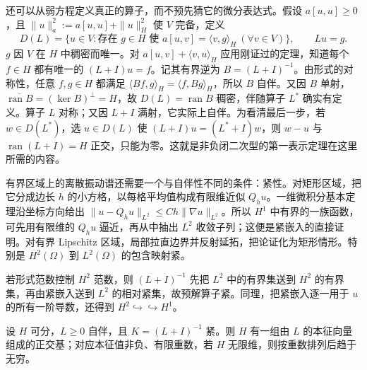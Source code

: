 还可以从弱方程定义真正的算子，而不预先猜它的微分表达式。假设 \(a[u,u]\ge0\)，且
\(\|u\|_a^2:=a[u,u]+\|u\|_H^2\) 使 \(V\) 完备，定义
\[
 D(L)=\{u\in V:\text{存在 }g\in H\text{ 使 }a[u,v]=\langle v,g\rangle_H\ (\forall v\in V)\},
 \qquad Lu=g.
\]
\(g\) 因 \(V\) 在 \(H\) 中稠密而唯一。对 \(a[u,v]+\langle v,u\rangle_H\) 应用刚证过的定理，知道每个 \(f\in H\) 都有唯一的
\((L+I)u=f\)。记其有界逆为 \(B=(L+I)^{-1}\)。由形式的对称性，任意 \(f,g\in H\) 都满足
\(\langle Bf,g\rangle_H=\langle f,Bg\rangle_H\)，所以 \(B\) 自伴。又因 \(B\) 单射，\(\overline{\operatorname{ran}B}=(\ker B)^{\perp}=H\)，故 \(D(L)=\operatorname{ran}B\) 稠密，伴随算子 \(L^*\) 确实有定义。算子 \(L\) 对称；又因 \(L+I\) 满射，它实际上自伴。为看清最后一步，若 \(w\in D(L^*)\)，选 \(u\in D(L)\) 使
\((L+I)u=(L^*+I)w\)，则 \(w-u\) 与 \(\operatorname{ran}(L+I)=H\) 正交，只能为零。这就是非负闭二次型的第一表示定理在这里所需的内容。

有界区域上的离散振动谱还需要一个与自伴性不同的条件：紧性。对矩形区域，把它分成边长 \(h\) 的小方格，以每格平均值构成有限维近似 \(Q_hu\)。一维微积分基本定理沿坐标方向给出
\(\|u-Q_hu\|_{L^2}\le Ch\|\nabla u\|_{L^2}\)。所以 \(H^1\) 中有界的一族函数，可先用有限维的 \(Q_hu\) 逼近，再从中抽出 \(L^2\) 收敛子列；这便是紧嵌入的直接证明。对有界 Lipschitz 区域，局部拉直边界并反射延拓，把论证化为矩形情形。特别是 \(H^2(\Omega)\) 到 \(L^2(\Omega)\) 的包含映射紧。

若形式范数控制 \(H^2\) 范数，则 \((L+I)^{-1}\) 先把 \(L^2\) 中的有界集送到 \(H^2\) 的有界集，再由紧嵌入送到 \(L^2\) 的相对紧集，故预解算子紧。同理，把紧嵌入逐一用于 \(u\) 的所有一阶导数，还得到 \(H^2\hookrightarrow\hookrightarrow H^1\)。

\begin{theorem}[紧预解式的离散谱]
设 \(H\) 可分，\(L\ge0\) 自伴，且 \(K=(L+I)^{-1}\) 紧。则 \(H\) 有一组由 \(L\) 的本征向量组成的正交基；对应本征值非负、有限重数，若 \(H\) 无限维，则按重数排列后趋于无穷。
\end{theorem}

